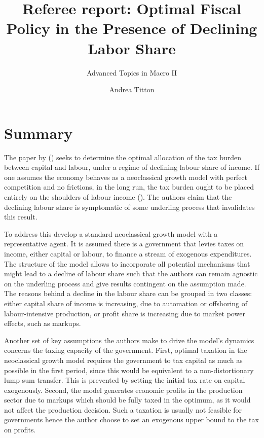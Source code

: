 \documentclass[american]{scrartcl}
\title{Referee report: Optimal Fiscal Policy in the Presence of Declining Labor Share}
\subtitle{Advanced Topics in Macro II}
\author{Andrea Titton}
\newcommand{\citein}[1]{\citeauthor{#1} (\citeyear{#1})}
\begin{document}

\maketitle


\section{Summary}

The paper by \citein{Atesagaoglu2020} seeks to determine the optimal allocation of the tax burden between capital and labour, under a regime of declining labour share of income. If one assumes the economy behaves as a neoclassical growth model with perfect competition and no frictions, in the long run, the tax burden ought to be placed entirely on the shoulders of labour income (\cite{Ramsey1928, Judd1985, Chamley1986}). The authors claim that the declining labour share is symptomatic of some underling process that invalidates this result.

To address this \citeauthor{Atesagaoglu2020} develop a standard neoclassical growth model with a representative agent. It is assumed there is a government that levies taxes on income, either capital or labour, to finance a stream of exogenous expenditures. The structure of the model allows to incorporate all potential mechanisms that might lead to a decline of labour share such that the authors can remain agnostic on the underling process and give results contingent on the assumption made. The reasons behind a decline in the labour share can be grouped in two classes: either capital share of income is increasing, due to automation or offshoring of labour-intensive production, or profit share is increasing due to market power effects, such as markups.

Another set of key assumptions the authors make to drive the model's dynamics concerns the taxing capacity of the government. First, optimal taxation in the neoclassical growth model requires the government to tax capital as much as possible in the first period, since this would be equivalent to a non-distortionary lump sum transfer. This is prevented by setting the initial tax rate on capital exogenously. Second, the model generates economic profits in the production sector due to markups which should be fully taxed in the optimum, as it would not affect the production decision. Such a taxation is usually not feasible for governments hence the author choose to set an exogenous upper bound to the tax on profits.
\end{document}
